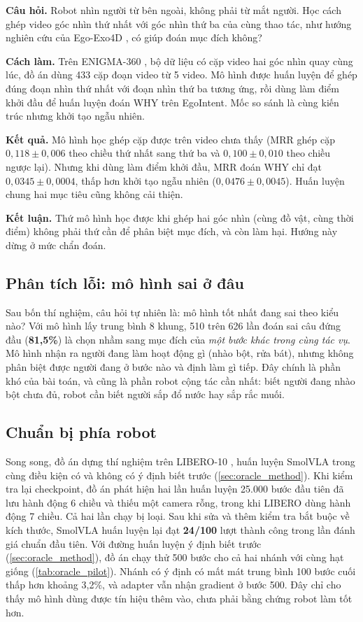 \documentclass[a4paper,oneside]{report}
\begin{document}
\textbf{Câu hỏi.} Robot nhìn người từ bên ngoài, không phải từ mắt người. Học cách ghép video góc nhìn thứ nhất với góc nhìn thứ ba của cùng thao tác, như hướng nghiên cứu của Ego-Exo4D \citep{grauman2024egoexo4d}, có giúp đoán mục đích không?

\textbf{Cách làm.} Trên ENIGMA-360 \citep{ragusa2026enigma360}, bộ dữ liệu có cặp video hai góc nhìn quay cùng lúc, đồ án dùng 433 cặp đoạn video từ 5 video. Mô hình được huấn luyện để ghép đúng đoạn nhìn thứ nhất với đoạn nhìn thứ ba tương ứng, rồi dùng làm điểm khởi đầu để huấn luyện đoán WHY trên EgoIntent. Mốc so sánh là cùng kiến trúc nhưng khởi tạo ngẫu nhiên.

\textbf{Kết quả.} Mô hình học ghép cặp được trên video chưa thấy (MRR ghép cặp $0{,}118 \pm 0{,}006$ theo chiều thứ nhất sang thứ ba và $0{,}100 \pm 0{,}010$ theo chiều ngược lại). Nhưng khi dùng làm điểm khởi đầu, MRR đoán WHY chỉ đạt $0{,}0345 \pm 0{,}0004$, thấp hơn khởi tạo ngẫu nhiên ($0{,}0476 \pm 0{,}0045$). Huấn luyện chung hai mục tiêu cũng không cải thiện.

\textbf{Kết luận.} Thứ mô hình học được khi ghép hai góc nhìn (cùng đồ vật, cùng thời điểm) không phải thứ cần để phân biệt mục đích, và còn làm hại. Hướng này dừng ở mức chẩn đoán.

\subsection{Phân tích lỗi: mô hình sai ở đâu}
\label{sec:stage0_errors}

Sau bốn thí nghiệm, câu hỏi tự nhiên là: mô hình tốt nhất đang sai theo kiểu nào? Với mô hình lấy trung bình 8 khung, 510 trên 626 lần đoán sai câu đứng đầu (\textbf{81,5\%}) là chọn nhầm sang mục đích của \textit{một bước khác trong cùng tác vụ}. Mô hình nhận ra người đang làm hoạt động gì (nhào bột, rửa bát), nhưng không phân biệt được người đang ở bước nào và định làm gì tiếp. Đây chính là phần khó của bài toán, và cũng là phần robot cộng tác cần nhất: biết người đang nhào bột chưa đủ, robot cần biết người sắp đổ nước hay sắp rắc muối.

\subsection{Chuẩn bị phía robot}
\label{sec:stage0_libero}

Song song, đồ án dựng thí nghiệm trên LIBERO-10 \citep{liu2023libero}, huấn luyện SmolVLA \citep{shukor2025smolvla} trong cùng điều kiện có và không có ý định biết trước (\cref{sec:oracle_method}). Khi kiểm tra lại checkpoint, đồ án phát hiện hai lần huấn luyện 25.000 bước đầu tiên đã lưu hành động 6 chiều và thiếu một camera rỗng, trong khi LIBERO dùng hành động 7 chiều. Cả hai lần chạy bị loại. Sau khi sửa và thêm kiểm tra bắt buộc về kích thước, SmolVLA huấn luyện lại đạt \textbf{24/100} lượt thành công trong lần đánh giá chuẩn đầu tiên. Với đường huấn luyện ý định biết trước (\cref{sec:oracle_method}), đồ án chạy thử 500 bước cho cả hai nhánh với cùng hạt giống (\cref{tab:oracle_pilot}). Nhánh có ý định có mất mát trung bình 100 bước cuối thấp hơn khoảng 3,2\%, và adapter vẫn nhận gradient ở bước 500. Đây chỉ cho thấy mô hình dùng được tín hiệu thêm vào, chưa phải bằng chứng robot làm tốt hơn.
\end{document}
